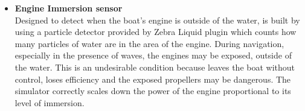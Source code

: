 \begin{itemize}
\item {\bf Engine Immersion sensor }\\
Designed to detect when the boat's engine is outside of the water, is built by using a particle detector provided by Zebra Liquid plugin which counts how many particles of water are in the area of the engine.
During navigation, especially in the presence of waves, the engines may be exposed, outside of the water. This is an undesirable condition because leaves the boat without control, loses efficiency and the exposed propellers may be dangerous. The simulator correctly scales down the power of the engine proportional to its level of immersion.
\end{itemize}


\newpage